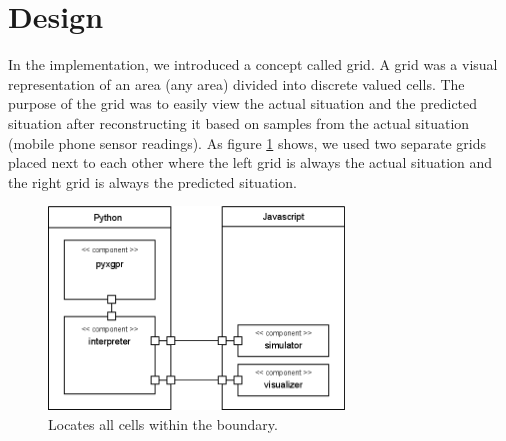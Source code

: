 \section{Design}
In the implementation, we introduced a concept called grid. A grid was a visual representation of an area (any area) divided into discrete valued cells. The purpose of the grid was to easily view the actual situation and the predicted situation after reconstructing it based on samples from the actual situation (mobile phone sensor readings). As figure \ref{fig:system-overview} shows, we used two separate grids placed next to each other where the left grid is always the actual situation and the right grid is always the predicted situation.
\begin{figure}[here]
  \centering
      \includegraphics[width=0.7\textwidth]{solution/graphics/system-overview.png}
  \caption{Locates all cells within the boundary.}
  \label{fig:system-overview}
\end{figure}